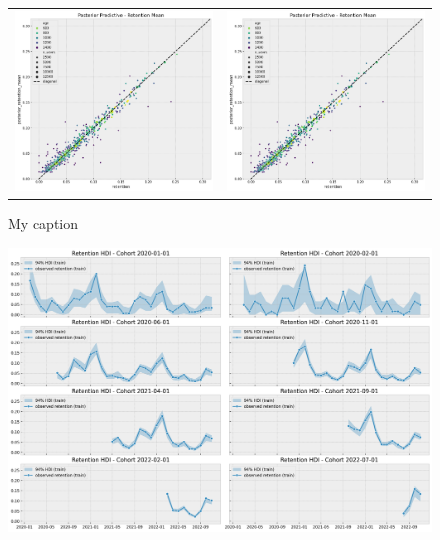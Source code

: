 \documentclass[11pt]{amsart}
\begin{document}
\begin{figure}
    \begin{tabular}{cc}
        \includegraphics[width=0.5 \textwidth]{images/revenue_retention_45_0.png} & 
        \includegraphics[width=0.5 \textwidth]{images/revenue_retention_45_0.png}
    \end{tabular}
    \caption{My caption}
\end{figure}

\begin{figure}
    \includegraphics[width=\textwidth]{images/revenue_retention_51_0.png}
\end{figure}
\end{document}
